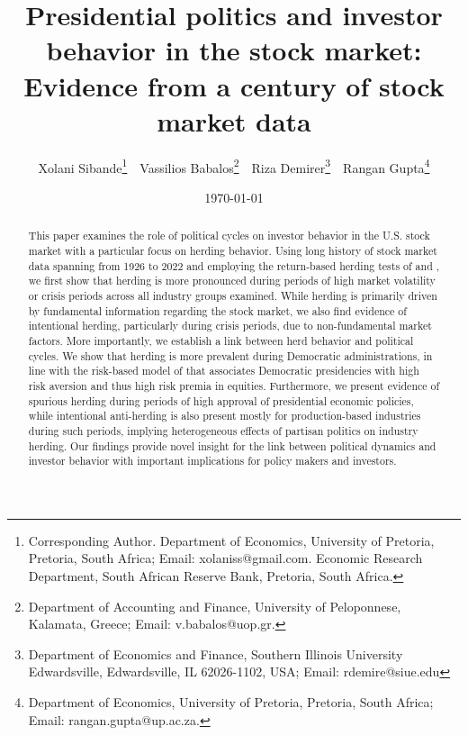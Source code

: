 \documentclass[
  letterpaper,
  DIV=11,
  numbers=noendperiod]{scrartcl}
\author{}
\date{}
\begin{document}
\title{Presidential politics and investor behavior in the stock market: Evidence from a century of stock market data}


\author { Xolani Sibande\footnote{Corresponding Author. Department of Economics, University of Pretoria, Pretoria, South Africa; Email: xolaniss@gmail.com. Economic Research Department, South African Reserve Bank, Pretoria, South Africa.} \,\, 
Vassilios Babalos\footnote{Department of Accounting and Finance, University of Peloponnese, Kalamata,  Greece; Email: v.babalos@uop.gr.} \,\,
Riza Demirer\footnote{Department of Economics and Finance, Southern Illinois University Edwardsville, Edwardsville, IL 62026-1102, USA; Email: rdemire@siue.edu} \,\,
Rangan Gupta\footnote{Department of Economics, University of Pretoria, Pretoria, South Africa; Email: rangan.gupta@up.ac.za.}
}
\date{\today}
\maketitle

\begin{abstract}

This paper examines the role of political cycles on investor behavior in the U.S. stock market with a particular focus on herding behavior. Using long history of stock market data spanning from 1926 to 2022 and employing the return-based herding tests of \cite{christie1995following} and \cite{chang2000examination}, we first show that herding is more pronounced during periods of high market volatility or crisis periods across all industry groups examined. While herding is primarily driven by fundamental information regarding the stock market, we also find evidence of intentional herding, particularly during crisis periods, due to non-fundamental market factors. More importantly, we establish a link between herd behavior and political cycles. We show that herding is more prevalent during Democratic administrations, in line with the risk-based model of \cite{pastor2020political} that associates Democratic presidencies with high risk aversion and thus high risk premia in equities. Furthermore, we present evidence of spurious herding during periods of high approval of presidential economic policies, while intentional anti-herding is also present mostly for production-based industries during such periods, implying heterogeneous effects of partisan politics on industry herding. Our findings provide novel insight for the link between political dynamics and investor behavior with important implications for policy makers and investors. 

\end{abstract}
\end{document}
